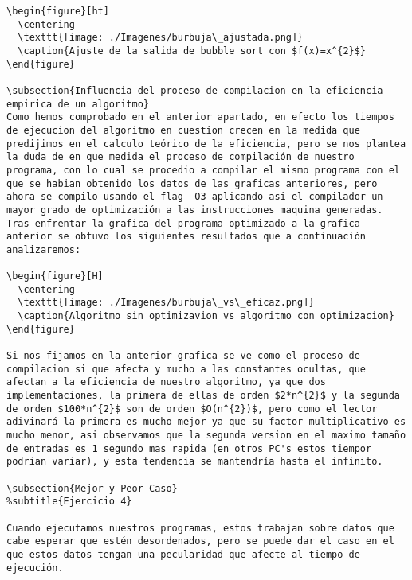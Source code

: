 \begin{lstlisting}
\begin{figure}[ht]
  \centering
  \texttt{[image: ./Imagenes/burbuja\_ajustada.png]}
  \caption{Ajuste de la salida de bubble sort con $f(x)=x^{2}$}
\end{figure}

\subsection{Influencia del proceso de compilacion en la eficiencia empirica de un algoritmo}
Como hemos comprobado en el anterior apartado, en efecto los tiempos de ejecucion del algoritmo en cuestion crecen en la medida que predijimos en el calculo teórico de la eficiencia, pero se nos plantea la duda de en que medida el proceso de compilación de nuestro programa, con lo cual se procedio a compilar el mismo programa con el que se habian obtenido los datos de las graficas anteriores, pero ahora se compilo usando el flag -O3 aplicando asi el compilador un mayor grado de optimización a las instrucciones maquina generadas. Tras enfrentar la grafica del programa optimizado a la grafica anterior se obtuvo los siguientes resultados que a continuación analizaremos:

\begin{figure}[H]
  \centering
  \texttt{[image: ./Imagenes/burbuja\_vs\_eficaz.png]}
  \caption{Algoritmo sin optimizavion vs algoritmo con optimizacion}
\end{figure}

Si nos fijamos en la anterior grafica se ve como el proceso de compilacion si que afecta y mucho a las constantes ocultas, que afectan a la eficiencia de nuestro algoritmo, ya que dos implementaciones, la primera de ellas de orden $2*n^{2}$ y la segunda de orden $100*n^{2}$ son de orden $O(n^{2})$, pero como el lector adivinará la primera es mucho mejor ya que su factor multiplicativo es mucho menor, asi observamos que la segunda version en el maximo tamaño de entradas es 1 segundo mas rapida (en otros PC's estos tiempor podrian variar), y esta tendencia se mantendría hasta el infinito.

\subsection{Mejor y Peor Caso}
%subtitle{Ejercicio 4}

Cuando ejecutamos nuestros programas, estos trabajan sobre datos que cabe esperar que estén desordenados, pero se puede dar el caso en el que estos datos tengan una pecularidad que afecte al tiempo de ejecución.


\end{lstlisting}
